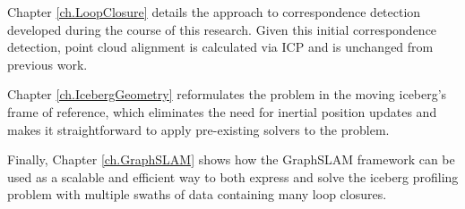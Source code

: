 Chapter \ref{ch.LoopClosure} details the approach to correspondence detection developed during the course of this research. Given this initial correspondence detection, point cloud alignment is calculated via ICP and is unchanged from previous work.

Chapter \ref{ch.IcebergGeometry} reformulates the problem in the moving iceberg's frame of reference, which eliminates the need for inertial position updates and makes it straightforward to apply pre-existing solvers to the problem.

Finally, Chapter \ref{ch.GraphSLAM} shows how the GraphSLAM framework can be used as a scalable and efficient way to both express and solve the iceberg profiling problem with multiple swaths of data containing many loop closures.

